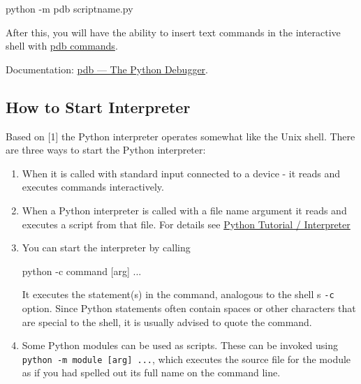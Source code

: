 \documentclass[
]{article}
\newenvironment{Shaded}{}{}
\newcommand{\AttributeTok}[1]{\textcolor[rgb]{0.49,0.56,0.16}{#1}}
\newcommand{\ExtensionTok}[1]{#1}
\newcommand{\NormalTok}[1]{#1}
\begin{document}
\begin{Shaded}
\begin{Highlighting}[]
\ExtensionTok{python} \AttributeTok{{-}m}\NormalTok{ pdb scriptname.py}
\end{Highlighting}
\end{Shaded}

After this, you will have the ability to insert text commands in the
interactive shell with
\href{https://docs.python.org/3/library/pdb.html\#debugger-commands}{pdb
commands}.

Documentation:
\href{https://docs.python.org/3/library/pdb.html?highlight=pdb\#module-pdb}{pdb
--- The Python Debugger}.

\hypertarget{how-to-start-interpreter}{%
\subsection{How to Start Interpreter}\label{how-to-start-interpreter}}

Based on {[}1{]} the Python interpreter operates somewhat like the Unix
shell. There are three ways to start the Python interpreter:

\begin{enumerate}
\def\labelenumi{\arabic{enumi}.}
\item
  When it is called with standard input connected to a device - it reads
  and executes commands interactively.
\item
  When a Python interpreter is called with a file name argument it reads
  and executes a script from that file. For details see
  \href{https://docs.python.org/3.13/tutorial/interpreter.html}{Python
  Tutorial / Interpreter}
\item
  You can start the interpreter by calling

\begin{Shaded}
\begin{Highlighting}[]
\ExtensionTok{python} \AttributeTok{{-}c}\NormalTok{ command [arg] ...}
\end{Highlighting}
\end{Shaded}

  It executes the statement(s) in the command, analogous to the shell s
  \texttt{-c} option. Since Python statements often contain spaces or
  other characters that are special to the shell, it is usually advised
  to quote the command.
\item
  Some Python modules can be used as scripts. These can be invoked using
  \texttt{python\ -m\ module\ {[}arg{]}\ ...}, which executes the source
  file for the module as if you had spelled out its full name on the
  command line.
\end{enumerate}
\end{document}
